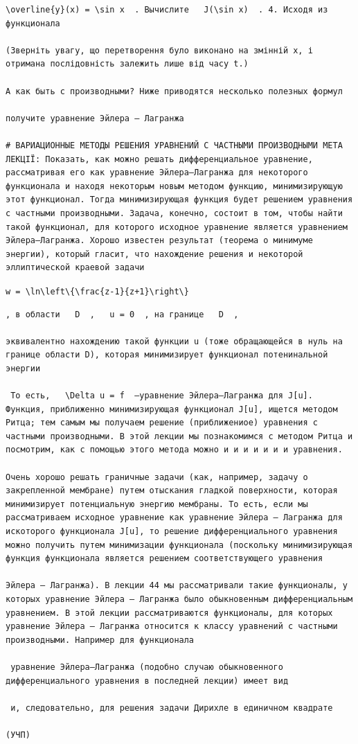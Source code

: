 \documentclass[
  ukrainian,
]{article}
\begin{document}
\begin{verbatim}
\overline{y}(x) = \sin x  . Вычислите   J(\sin x)  . 4. Исходя из функционала

(Зверніть увагу, що перетворення було виконано на змінній x, і отримана послідовність залежить лише від часу t.)

А как быть с производными? Ниже приводятся несколько полезных формул

получите уравнение Эйлера — Лагранжа

# ВАРИАЦИОННЫЕ МЕТОДЫ РЕШЕНИЯ УРАВНЕНИЙ С ЧАСТНЫМИ ПРОИЗВОДНЫМИ МЕТА ЛЕКЦІЇ: Показать, как можно решать дифференциальное уравнение, рассматривая его как уравнение Эйлера—Лагранжа для некоторого функционала и находя некоторым новым методом функцию, минимизирующую этот функционал. Тогда минимизирующая функция будет решением уравнения с частными производными. Задача, конечно, состоит в том, чтобы найти такой функционал, для которого исходное уравнение является уравнением Эйлера—Лагранжа. Хорошо известен результат (теорема о минимуме энергии), который гласит, что нахождение решения и некоторой эллиптической краевой задачи
\end{verbatim}

\texttt{w\ =\ \textbackslash{}ln\textbackslash{}left\textbackslash{}\{\textbackslash{}frac\{z-1\}\{z+1\}\textbackslash{}right\textbackslash{}\}}

\begin{verbatim}
, в области   D  ,   u = 0  , на границе   D  ,

эквивалентно нахождению такой функции u (тоже обращающейся в нуль на границе области D), которая минимизирует функционал потенинальной энергии

 То есть,   \Delta u = f  —уравнение Эйлера—Лагранжа для J[u]. Функция, приближенно минимизирующая функционал J[u], ищется методом Ритца; тем самым мы получаем решение (приближениое) уравнения с частными производными. В этой лекции мы познакомимся с методом Ритца и посмотрим, как с помощью этого метода можно и и и и и и и уравнения.

Очень хорошо решать граничные задачи (как, например, задачу о закрепленной мембране) путем отыскания гладкой поверхности, которая минимизирует потенциальную энергию мембраны. То есть, если мы рассматриваем исходное уравнение как уравнение Эйлера — Лагранжа для искоторого функционала J[u], то решение дифференциального уравнения можно получить путем минимизации функционала (поскольку минимизирующая функция функционала является решением соответствующего уравнения

Эйлера — Лагранжа). В лекции 44 мы рассматривали такие функционалы, у которых уравнение Эйлера — Лагранжа было обыкновенным дифференциальным уравнением. В этой лекции рассматриваются функционалы, для которых уравнение Эйлера — Лагранжа относится к классу уравнений с частными производными. Например для функционала

 уравнение Эйлера—Лагранжа (подобно случаю обыкновенного дифференциального уравнения в последней лекции) имеет вид

 и, следовательно, для решения задачи Дирихле в единичном квадрате

(УЧП)
\end{verbatim}
\end{document}
